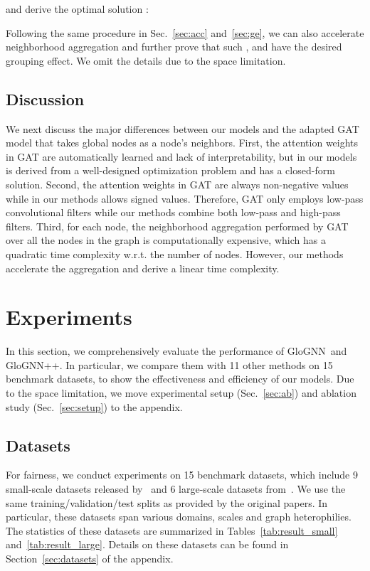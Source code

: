\documentclass[nohyperref]{article}
\theoremstyle{plain}
\theoremstyle{definition}
\theoremstyle{remark}
\newcommand{\ada}{GloGNN}
\begin{document}
and derive the optimal solution :

Following the same procedure in Sec.~\ref{sec:acc} and~\ref{sec:ge},
we can also accelerate neighborhood aggregation and further prove that such ,  and  have the desired grouping effect.
We omit the details due to the space limitation.

\subsection{Discussion}
We next discuss 
the major differences between our models and the adapted GAT model that takes global nodes as a node's neighbors.
First,
the attention weights in GAT are automatically learned and lack of interpretability, 
but  in our models is derived from a well-designed optimization problem and has a closed-form solution.
Second,
the attention weights in GAT are always non-negative values while  in our methods allows signed values. 
Therefore,
GAT only employs low-pass convolutional filters while our methods combine both low-pass and high-pass filters.
Third,
for each node,
the neighborhood aggregation performed by GAT over all the nodes in the graph
is computationally expensive, 
which has a quadratic time complexity w.r.t. the number of nodes.
However,
our methods
accelerate the aggregation and derive a linear time complexity.




 \section{Experiments}
\label{sec:exp}
In this section,
we comprehensively evaluate the performance of \ada\ and \ada++.
In particular,
we compare them with 11 other methods on 15 benchmark datasets,
to show the effectiveness and efficiency of our models.
Due to the space limitation,
we move experimental setup (Sec.~\ref{sec:ab}) and ablation study (Sec.~\ref{sec:setup}) to the appendix.

\subsection{Datasets}
For fairness,
we conduct experiments on 15 benchmark datasets,
which include 9 small-scale datasets released by~\cite{pei2020geom} and 6 large-scale datasets from~\cite{lim2021large}.
We use the same training/validation/test splits as provided by the original papers.
In particular,
these datasets
span various domains, scales and graph heterophilies.
The statistics of these datasets are summarized in Tables~\ref{tab:result_small} and~\ref{tab:result_large}.
Details on these datasets can be found in Section~\ref{sec:datasets} of the appendix. 
\end{document}
